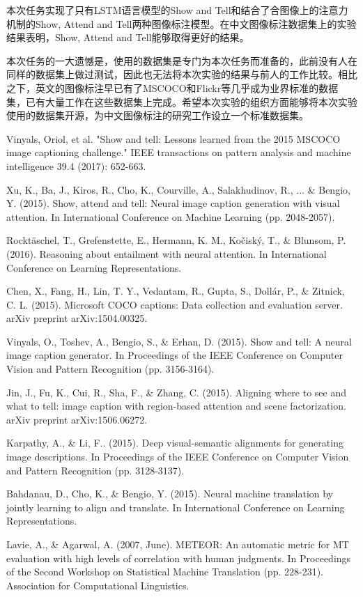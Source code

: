 \documentclass[10pt,a4paper,UTF8]{ctexart}
\begin{document}
\begin{spacing}{1.5}
		本次任务实现了只有LSTM语言模型的Show and Tell和结合了合图像上的注意力机制的Show, Attend and Tell两种图像标注模型。在中文图像标注数据集上的实验结果表明，Show, Attend and Tell能够取得更好的结果。
		
		本次任务的一大遗憾是，使用的数据集是专门为本次任务而准备的，此前没有人在同样的数据集上做过测试，因此也无法将本次实验的结果与前人的工作比较。相比之下，英文的图像标注早已有了MSCOCO和Flickr等几乎成为业界标准的数据集，已有大量工作在这些数据集上完成。希望本次实验的组织方面能够将本次实验使用的数据集开源，为中文图像标注的研究工作设立一个标准数据集。
				
		\begin{thebibliography}{9}
			 Vinyals, Oriol, et al. "Show and tell: Lessons learned from the 2015 MSCOCO image captioning challenge." IEEE transactions on pattern analysis and machine intelligence 39.4 (2017): 652-663.
			
			 Xu, K., Ba, J., Kiros, R., Cho, K., Courville, A., Salakhudinov, R., ... \& Bengio, Y. (2015). Show, attend and tell: Neural image caption generation with visual attention. In International Conference on Machine Learning (pp. 2048-2057).
			
			 Rocktäschel, T., Grefenstette, E., Hermann, K. M., Kočiský, T., \& Blunsom, P. (2016). Reasoning about entailment with neural attention. In International Conference on Learning Representations. 
						
			 Chen, X., Fang, H., Lin, T. Y., Vedantam, R., Gupta, S., Dollár, P., \& Zitnick, C. L. (2015). Microsoft COCO captions: Data collection and evaluation server. arXiv preprint arXiv:1504.00325.
			
			 Vinyals, O., Toshev, A., Bengio, S., \& Erhan, D. (2015). Show and tell: A neural image caption generator. In Proceedings of the IEEE Conference on Computer Vision and Pattern Recognition (pp. 3156-3164).
			
			 Jin, J., Fu, K., Cui, R., Sha, F., \& Zhang, C. (2015). Aligning where to see and what to tell: image caption with region-based attention and scene factorization. arXiv preprint arXiv:1506.06272.
			
			 Karpathy, A., \& Li, F.. (2015). Deep visual-semantic alignments for generating image descriptions. In Proceedings of the IEEE Conference on Computer Vision and Pattern Recognition (pp. 3128-3137).
			
			 Bahdanau, D., Cho, K., \& Bengio, Y. (2015). Neural machine translation by jointly learning to align and translate. In International Conference on Learning Representations. 
			
			 Lavie, A., \& Agarwal, A. (2007, June). METEOR: An automatic metric for MT evaluation with high levels of correlation with human judgments. In Proceedings of the Second Workshop on Statistical Machine Translation (pp. 228-231). Association for Computational Linguistics.

		\end{thebibliography}
		
	\end{spacing}
\end{document}
